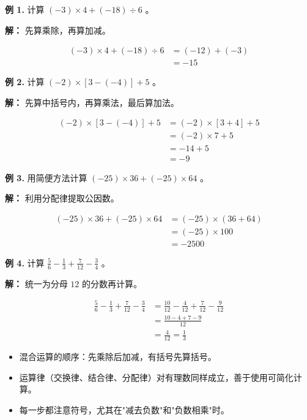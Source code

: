 \begin{workedexamples}


\textbf{例 1.} 计算 $(-3) \times 4 + (-18) \div 6$ 。

\textbf{解：} 先算乘除，再算加减。

\[
\begin{aligned}
(-3) \times 4 + (-18) \div 6 &= (-12) + (-3) \\
&= -15
\end{aligned}
\]


\textbf{例 2.} 计算 $(-2) \times [3 - (-4)] + 5$ 。

\textbf{解：} 先算中括号内，再算乘法，最后算加法。

\[
\begin{aligned}
(-2) \times [3 - (-4)] + 5 &= (-2) \times [3 + 4] + 5 \\
&= (-2) \times 7 + 5 \\
&= -14 + 5 \\
&= -9
\end{aligned}
\]


\textbf{例 3.} 用简便方法计算 $(-25) \times 36 + (-25) \times 64$ 。

\textbf{解：} 利用分配律提取公因数。

\[
\begin{aligned}
(-25) \times 36 + (-25) \times 64 &= (-25) \times (36 + 64) \\
&= (-25) \times 100 \\
&= -2500
\end{aligned}
\]


\textbf{例 4.} 计算 $\frac{5}{6} - \frac{1}{3} + \frac{7}{12} - \frac{3}{4}$ 。

\textbf{解：} 统一为分母 $12$ 的分数再计算。

\[
\begin{aligned}
\frac{5}{6} - \frac{1}{3} + \frac{7}{12} - \frac{3}{4} &= \frac{10}{12} - \frac{4}{12} + \frac{7}{12} - \frac{9}{12} \\
&= \frac{10 - 4 + 7 - 9}{12} \\
&= \frac{4}{12} = \frac{1}{3}
\end{aligned}
\]


\end{workedexamples}

\begin{keytakeaway}


\begin{itemize}
  \item 混合运算的顺序：先乘除后加减，有括号先算括号。
  \item 运算律（交换律、结合律、分配律）对有理数同样成立，善于使用可简化计算。
  \item 每一步都注意符号，尤其在"减去负数"和"负数相乘"时。
\end{itemize}


\end{keytakeaway}

